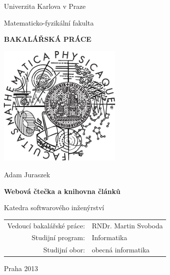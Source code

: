 
\pagestyle{empty}
\begin{center}

\large

Univerzita Karlova v Praze

\medskip

Matematicko-fyzikální fakulta

\vfill

{\bf\Large BAKALÁŘSKÁ PRÁCE}

\vfill

\centerline{\mbox{\includegraphics[width=60mm]{img/logo.eps}}}

\vfill
\vspace{5mm}

{\LARGE Adam Juraszek}

\vspace{15mm}

{\LARGE\bfseries Webová čtečka a knihovna článků}

\vfill

Katedra softwarového inženýrství

\vfill

\begin{tabular}{rl}

Vedoucí bakalářské práce: & RNDr. Martin Svoboda \\
\noalign{\vspace{2mm}}
Studijní program: & Informatika \\
\noalign{\vspace{2mm}}
Studijní obor: & obecná informatika \\
\end{tabular}

\vfill

Praha 2013

\end{center}
